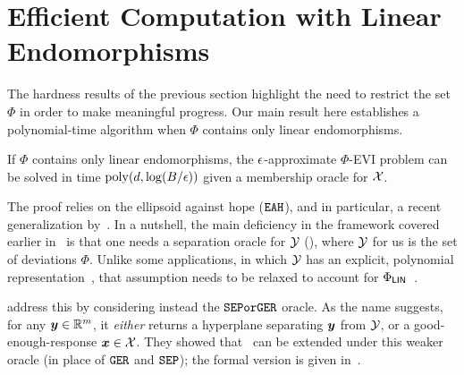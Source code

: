 \section{Efficient Computation with Linear Endomorphisms}
\label{sec:main}

The hardness results of the previous section highlight the need to restrict the set $\Phi$ in order to make meaningful progress. Our main result here establishes a polynomial-time algorithm when $\Phi$ contains only linear endomorphisms.

\begin{theorem}
    \label{th:elvi}
    If $\Phi$ contains only linear endomorphisms, the $\epsilon$-approximate $\Phi$-EVI problem can be solved in time $\mathrm{poly}(d, \log(B/\epsilon))$ given a membership oracle for ${\mathcal{X}}$.
\end{theorem}

The proof relies on the ellipsoid against hope ($\mathtt{EAH}$), and in particular, a recent generalization by~\citet{Daskalakis24:Efficient}. In a nutshell, the main deficiency in the framework covered earlier in~ is that one needs a separation oracle for ${\mathcal{Y}}$ (), where ${\mathcal{Y}}$ for us is the set of deviations $\Phi$. Unlike some applications, in which ${\mathcal{Y}}$ has an explicit, polynomial representation~\citep{Papadimitriou08:Computing}, that assumption needs to be relaxed to account for $\Phi_\mathsf{LIN}$~\citep[Theorem 3.4]{Daskalakis24:Efficient}.

\citet{Daskalakis24:Efficient} address this by considering instead the $\mathtt{SEPorGER}$ oracle. As the name suggests, for any ${\bm{y}} \in \mathbb R^m$, it \emph{either} returns a hyperplane separating ${\bm{y}}$ from ${\mathcal{Y}}$, or a good-enough-response ${\bm{x}} \in {\mathcal{X}}$. They showed that~ can be extended under this weaker oracle (in place of $\mathtt{GER}$ and $\mathtt{SEP}$); the formal version is given in~.

